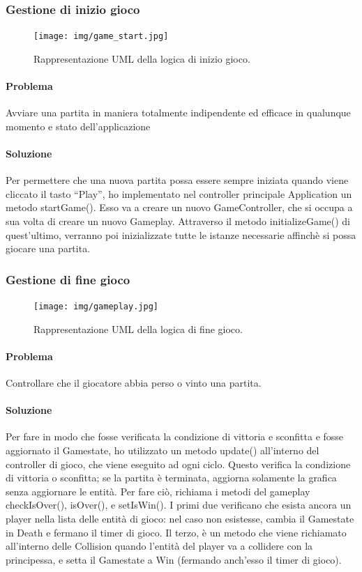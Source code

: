\subsubsection{Gestione di inizio gioco}

\begin{figure}[H]
\centering{}
\texttt{[image: img/game\_start.jpg]}
\caption{Rappresentazione UML della logica di inizio gioco.}
\end{figure}

\paragraph{Problema} Avviare una partita in maniera totalmente indipendente ed efficace in qualunque momento e stato dell’applicazione

\paragraph{Soluzione} Per permettere che una nuova partita possa essere sempre iniziata quando viene cliccato il tasto “Play”, ho implementato nel controller principale Application un metodo startGame(). Esso va a creare un nuovo GameController, che si occupa a sua volta di creare un nuovo Gameplay. Attraverso il metodo initializeGame() di quest’ultimo, verranno poi inizializzate tutte le istanze necessarie affinchè si possa giocare una partita.

\subsubsection{Gestione di fine gioco}

\begin{figure}[H]
\centering{}
\texttt{[image: img/gameplay.jpg]}
\caption{Rappresentazione UML della logica di fine gioco.}
\end{figure}

\paragraph{Problema} Controllare che il giocatore abbia perso o vinto una partita.

\paragraph{Soluzione} Per fare in modo che fosse verificata la condizione di vittoria e sconfitta e fosse aggiornato il Gamestate, ho utilizzato un metodo update() all’interno del controller di gioco, che viene eseguito ad ogni ciclo. Questo verifica la condizione di vittoria o sconfitta; se la partita è terminata, aggiorna solamente la grafica senza aggiornare le entità. Per fare ciò, richiama i metodi del gameplay checkIsOver(), isOver(), e setIsWin(). I primi due verificano che esista ancora un player nella lista delle entità di gioco: nel caso non esistesse, cambia il Gamestate in Death e fermano il timer di gioco. Il terzo, è un metodo che viene richiamato all’interno delle Collision quando l’entità del player va a collidere con la principessa, e setta il Gamestate a Win (fermando anch’esso il timer di gioco).

